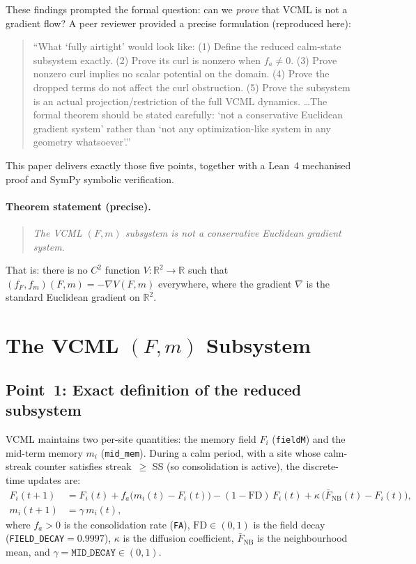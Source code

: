 \documentclass[11pt,a4paper]{article}
\begin{document}
These findings prompted the formal question: can we \emph{prove}
that VCML is not a gradient flow?
A peer reviewer provided a precise formulation (reproduced here):

\begin{quote}
``What `fully airtight' would look like: (1) Define the reduced calm-state
subsystem exactly. (2) Prove its curl is nonzero when $f_a \neq 0$.
(3) Prove nonzero curl implies no scalar potential on the domain.
(4) Prove the dropped terms do not affect the curl obstruction.
(5) Prove the subsystem is an actual projection/restriction of the full
VCML dynamics. \ldots The formal theorem should be stated carefully:
`not a conservative Euclidean gradient system' rather than `not any
optimization-like system in any geometry whatsoever'.''
\end{quote}

This paper delivers exactly those five points, together with a Lean~4
mechanised proof and SymPy symbolic verification.

\paragraph{Theorem statement (precise).}
\begin{quote}
\textit{The VCML $(F, m)$ subsystem is not a conservative
Euclidean gradient system.}
\end{quote}
That is: there is no $C^2$ function $V:\mathbb{R}^2\to\mathbb{R}$ such that
$(f_F, f_m)(F, m) = -\nabla V(F, m)$ everywhere, where the gradient
$\nabla$ is the standard Euclidean gradient on $\mathbb{R}^2$.

\section{The VCML $(F, m)$ Subsystem}
\label{sec:subsystem}

\subsection{Point~1: Exact definition of the reduced subsystem}

VCML maintains two per-site quantities: the memory field $F_i$ (\texttt{fieldM})
and the mid-term memory $m_i$ (\texttt{mid\_mem}).
During a calm period, with a site whose calm-streak counter satisfies
streak~$\geq$ SS (so consolidation is active), the discrete-time updates are:
\begin{align}
  F_i(t+1) &= F_i(t) + f_a\bigl(m_i(t) - F_i(t)\bigr)
              - (1 - \mathrm{FD})\,F_i(t)
              + \kappa\,\bigl(\bar{F}_{\mathrm{NB}}(t) - F_i(t)\bigr),
              \label{eq:F-full}\\
  m_i(t+1) &= \gamma\,m_i(t),
  \label{eq:m-full}
\end{align}
where $f_a > 0$ is the consolidation rate (\texttt{FA}),
$\mathrm{FD}\in(0,1)$ is the field decay (\texttt{FIELD\_DECAY}$=0.9997$),
$\kappa$ is the diffusion coefficient, $\bar{F}_{\mathrm{NB}}$ is the
neighbourhood mean, and $\gamma = \texttt{MID\_DECAY}\in(0,1)$.
\end{document}
